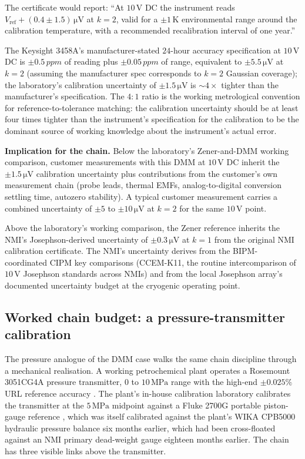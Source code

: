 The certificate would report: ``At $10\,\si{\volt}$ DC the
instrument reads $V_{\text{ref}} + (0.4 \pm 1.5)\,\si{\micro
\volt}$ at $k = 2$, valid for a $\pm 1\,\si{\kelvin}$
environmental range around the calibration temperature, with a
recommended recalibration interval of one year.''

The Keysight 3458A's manufacturer-stated $24$-hour accuracy
specification at $10\,\si{\volt}$ DC is $\pm 0.5\,\si{ppm}$ of
reading plus $\pm 0.05\,\si{ppm}$ of range, equivalent to
$\pm 5.5\,\si{\micro\volt}$ at $k = 2$ (assuming the manufacturer
spec corresponds to $k = 2$ Gaussian coverage); the laboratory's
calibration uncertainty of $\pm 1.5\,\si{\micro\volt}$ is $\sim
4\times$ tighter than the manufacturer's specification. The
$4{:}1$ ratio is the working metrological convention for
reference-to-tolerance matching: the calibration uncertainty
should be at least four times tighter than the instrument's
specification for the calibration to be the dominant source of
working knowledge about the instrument's actual error.

\textbf{Implication for the chain.} Below the laboratory's
Zener-and-DMM working comparison, customer measurements with
this DMM at $10\,\si{\volt}$ DC inherit the $\pm 1.5\,\si{\micro
\volt}$ calibration uncertainty plus contributions from the
customer's own measurement chain (probe leads, thermal EMFs,
analog-to-digital conversion settling time, autozero stability).
A typical customer measurement carries a combined uncertainty of
$\pm 5$ to $\pm 10\,\si{\micro\volt}$ at $k = 2$ for the same
$10\,\si{\volt}$ point.

Above the laboratory's working comparison, the Zener reference
inherits the NMI's Josephson-derived uncertainty of $\pm 0.3\,\si{
\micro\volt}$ at $k = 1$ from the original NMI calibration
certificate. The NMI's uncertainty derives from the BIPM-
coordinated CIPM key comparisons (CCEM-K11, the routine
intercomparison of $10\,\si{\volt}$ Josephson standards across
NMIs) and from the local Josephson array's documented
uncertainty budget at the cryogenic operating point.

\subsection{Worked chain budget: a pressure-transmitter
calibration}

The pressure analogue of the DMM case walks the same chain
discipline through a mechanical realisation. A working petrochemical
plant operates a Rosemount 3051CG4A pressure transmitter, $0$ to
$10\,\si{\mega\pascal}$ range with the high-end $\pm 0.025\%$ URL
reference accuracy \cite{web:ch03t3b-rosemount-3051}. The plant's
in-house calibration laboratory calibrates the transmitter at the
$5\,\si{\mega\pascal}$ midpoint against a Fluke 2700G portable
piston-gauge reference \cite{web:ch03t3b-fluke-2700g}, which was
itself calibrated against the plant's WIKA CPB5000 hydraulic
pressure balance \cite{web:ch03t3b-wika-cpb5000} six months
earlier, which had been cross-floated against an NMI primary
dead-weight gauge eighteen months earlier. The chain has three
visible links above the transmitter.

